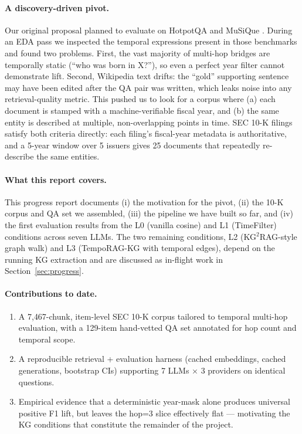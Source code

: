 \documentclass[11pt]{article}
\begin{document}
\paragraph{A discovery-driven pivot.}
Our original proposal planned to evaluate on HotpotQA
\citep{yang2018hotpotqa} and MuSiQue \citep{trivedi2022musique}. During
an EDA pass we inspected the temporal expressions present in those
benchmarks and found two problems. First, the vast majority of multi-hop
bridges are temporally static (``who was born in X?''), so even a perfect
year filter cannot demonstrate lift. Second, Wikipedia text drifts: the
``gold'' supporting sentence may have been edited after the QA pair was
written, which leaks noise into any retrieval-quality metric. This pushed
us to look for a corpus where (a) each document is stamped with a
machine-verifiable fiscal year, and (b) the same entity is described at
multiple, non-overlapping points in time. SEC 10-K filings satisfy both
criteria directly: each filing's fiscal-year metadata is authoritative,
and a 5-year window over 5 issuers gives 25 documents that repeatedly
re-describe the same entities.

\paragraph{What this report covers.}
This progress report documents (i) the motivation for the pivot, (ii) the
10-K corpus and QA set we assembled, (iii) the pipeline we have built so
far, and (iv) the first evaluation results from the L0 (vanilla cosine)
and L1 (TimeFilter) conditions across seven LLMs. The two remaining
conditions, L2 (KG$^{2}$RAG-style graph walk) and L3 (TempoRAG-KG with
temporal edges), depend on the running KG extraction and are discussed
as in-flight work in Section~\ref{sec:progress}.

\paragraph{Contributions to date.}
\begin{enumerate}
\itemsep 0pt \parskip 0pt
  \item A 7{,}467-chunk, item-level SEC 10-K corpus tailored to
    temporal multi-hop evaluation, with a 129-item hand-vetted QA set
    annotated for hop count and temporal scope.
  \item A reproducible retrieval + evaluation harness (cached embeddings,
    cached generations, bootstrap CIs) supporting 7 LLMs $\times$ 3
    providers on identical questions.
  \item Empirical evidence that a deterministic year-mask alone produces
    universal positive F1 lift, but leaves the hop=3 slice effectively
    flat --- motivating the KG conditions that constitute the remainder
    of the project.
\end{enumerate}
\end{document}
